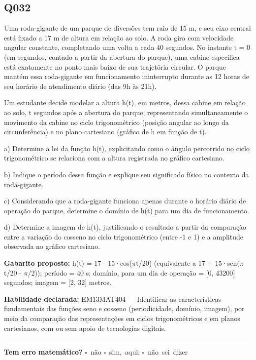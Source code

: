 \documentclass[11pt,a4paper]{article}
\begin{document}
\begin{samepage}
\subsection*{Q032}
Uma roda-gigante de um parque de diversões tem raio de 15 m, e seu eixo central está fixado a 17 m de altura em relação ao solo. A roda gira com velocidade angular constante, completando uma volta a cada 40 segundos. No instante t = 0 (em segundos, contado a partir da abertura do parque), uma cabine específica está exatamente no ponto mais baixo de sua trajetória circular. O parque mantém essa roda-gigante em funcionamento ininterrupto durante as 12 horas de seu horário de atendimento diário (das 9h às 21h).

Um estudante decide modelar a altura h(t), em metros, dessa cabine em relação ao solo, t segundos após a abertura do parque, representando simultaneamente o movimento da cabine no ciclo trigonométrico (posição angular ao longo da circunferência) e no plano cartesiano (gráfico de h em função de t).

a) Determine a lei da função h(t), explicitando como o ângulo percorrido no ciclo trigonométrico se relaciona com a altura registrada no gráfico cartesiano.

b) Indique o período dessa função e explique seu significado físico no contexto da roda-gigante.

c) Considerando que a roda-gigante funciona apenas durante o horário diário de operação do parque, determine o domínio de h(t) para um dia de funcionamento.

d) Determine a imagem de h(t), justificando o resultado a partir da comparação entre a variação do cosseno no ciclo trigonométrico (entre -1 e 1) e a amplitude observada no gráfico cartesiano.

\textbf{Gabarito proposto:} h(t) = 17 - 15·cos($\pi$t/20) (equivalente a 17 + 15·sen($\pi$t/20 - $\pi$/2)); período = 40 s; domínio, para um dia de operação = [0, 43200] segundos; imagem = [2, 32] metros.

\textbf{Habilidade declarada:} EM13MAT404 --- Identificar as características fundamentais das funções seno e cosseno (periodicidade, domínio, imagem), por meio da comparação das representações em ciclos trigonométricos e em planos cartesianos, com ou sem apoio de tecnologias digitais.
\end{samepage}

\noindent\rule{\linewidth}{0.4pt}
\textbf{Tem erro matemático?}\quad
\mbox{$\square$~não} \quad \mbox{$\square$~sim, aqui:} \underline{\hspace{5cm}}
\quad \mbox{$\square$~não sei dizer}
\end{document}
